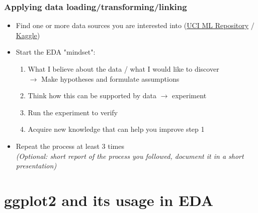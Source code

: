 \documentclass[a4paper]{article}
\begin{document}
			\subsubsection{Applying data loading/transforming/linking}
			
			\begin{itemize}
				\item Find one or more data sources you are interested into (\href{https://archive.ics.uci.edu/ml/datasets.php}{UCI ML Repository} / \href{https://www.kaggle.com/datasets}{Kaggle})
				\item Start the EDA "mindset":
					\begin{enumerate}
						\item What I believe about the data / what I would like to discover \\
							$\rightarrow$ Make hypotheses and formulate assumptions
						\item Think how this can be supported by data $\rightarrow$ experiment
						\item Run the experiment to verify
						\item Acquire new knowledge that can help you improve step 1
					\end{enumerate}
				\item Repeat the process at least 3 times \\
				\textit{(Optional: short report of the process you followed, document it in a short presentation)}
			\end{itemize}
		
	\section{ggplot2 and its usage in EDA}
	
	
				
\end{document}
